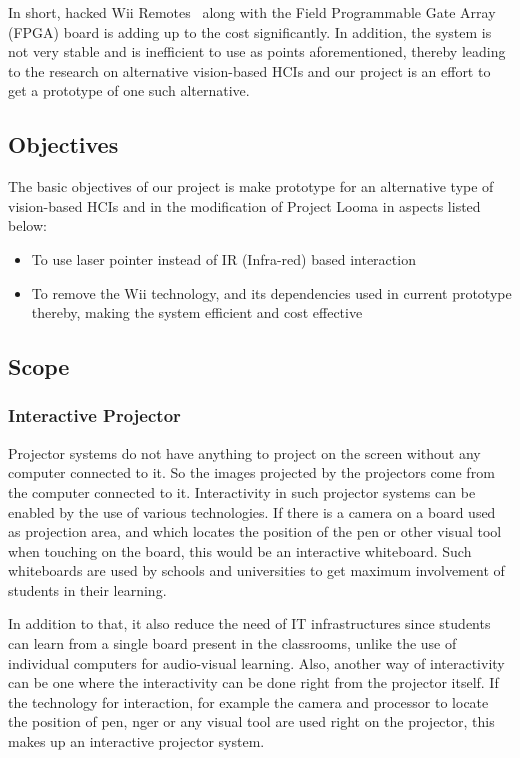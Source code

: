 \documentclass[12pt, a4paper]{article}
\begin{document}
In short, hacked Wii Remotes~\cite{joh} along with the Field Programmable Gate Array (FPGA) board is adding up to the cost significantly. In addition, the system is not very stable and is inefficient to use as points aforementioned, thereby leading to the research on alternative vision-based HCIs and our project is an effort to get
a prototype of one such alternative.

\subsection{Objectives}
The basic objectives of our project is make prototype for an alternative type of vision-based HCIs and in the modification of Project Looma in aspects listed below:
\begin{itemize}
	\item To use laser pointer instead of IR (Infra-red) based interaction
	\item To remove the Wii technology, and its dependencies used in current prototype thereby, making the system efficient and cost effective
\end{itemize}
\newpage
\subsection{Scope}
\subsubsection{Interactive Projector}
Projector systems do not have anything to project on the screen without
any computer connected to it. So the images projected by the projectors
come from the computer connected to it. Interactivity in such projector
systems can be enabled by the use of various technologies. If there is a camera
on a board used as projection area, and which locates the position of the pen
or other visual tool when touching on the board, this would be an interactive
whiteboard. Such whiteboards are used by schools and universities to get
maximum involvement of students in their learning. 

In addition to that, it also reduce the need of IT infrastructures since students can learn from a
single board present in the classrooms, unlike the use of individual computers
for audio-visual learning. Also, another way of interactivity can be one where
the interactivity can be done right from the projector itself. If the technology
for interaction, for example the camera and processor to locate the position
of pen, nger or any visual tool are used right on the projector, this makes up
an interactive projector system. 
\end{document}
